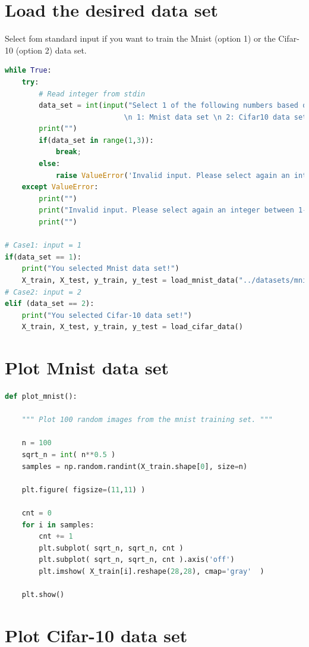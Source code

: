 \documentclass[11pt]{article}
\begin{document}
\section{Load the desired data set}
\noindent Select fom standard input if you want to train the Mnist (option 1) or the Cifar-10 (option 2) data set.
\begin{lstlisting}[language = Python]
while True:
    try:
        # Read integer from stdin
        data_set = int(input("Select 1 of the following numbers based on the desired data set:\n \
                            \n 1: Mnist data set \n 2: Cifar10 data set\n"))
        print("")
        if(data_set in range(1,3)):
            break;
        else:
            raise ValueError('Invalid input. Please select again an integer between 1-2!')
    except ValueError:
        print("")
        print("Invalid input. Please select again an integer between 1-2!")
        print("")
            
# Case1: input = 1
if(data_set == 1):
    print("You selected Mnist data set!")
    X_train, X_test, y_train, y_test = load_mnist_data("../datasets/mnistdata/")
# Case2: input = 2
elif (data_set == 2):
    print("You selected Cifar-10 data set!")
    X_train, X_test, y_train, y_test = load_cifar_data()
\end{lstlisting}

\newpage
\section{Plot Mnist data set}

\begin{lstlisting}[language = Python]
def plot_mnist():
    
    """ Plot 100 random images from the mnist training set. """
    
    n = 100
    sqrt_n = int( n**0.5 )
    samples = np.random.randint(X_train.shape[0], size=n)

    plt.figure( figsize=(11,11) )

    cnt = 0
    for i in samples:
        cnt += 1
        plt.subplot( sqrt_n, sqrt_n, cnt )
        plt.subplot( sqrt_n, sqrt_n, cnt ).axis('off')
        plt.imshow( X_train[i].reshape(28,28), cmap='gray'  )

    plt.show()
\end{lstlisting}

\section{Plot Cifar-10 data set }
\end{document}
